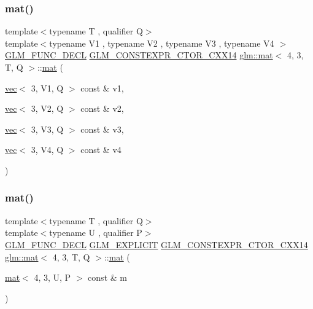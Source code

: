 \subsubsection{\texorpdfstring{mat()}{mat()}\hspace{0.1cm}{\footnotesize\ttfamily [8/21]}}
{\footnotesize\ttfamily template$<$typename T , qualifier Q$>$ \\
template$<$typename V1 , typename V2 , typename V3 , typename V4 $>$ \\
\hyperlink{setup_8hpp_ab2d052de21a70539923e9bcbf6e83a51}{G\+L\+M\+\_\+\+F\+U\+N\+C\+\_\+\+D\+E\+CL} \hyperlink{setup_8hpp_a0900f9145e68bf6061b6f5e7be3fa751}{G\+L\+M\+\_\+\+C\+O\+N\+S\+T\+E\+X\+P\+R\+\_\+\+C\+T\+O\+R\+\_\+\+C\+X\+X14} \hyperlink{structglm_1_1mat}{glm\+::mat}$<$ 4, 3, T, Q $>$\+::\hyperlink{structglm_1_1mat}{mat} (\begin{DoxyParamCaption}\item[{\hyperlink{structglm_1_1vec}{vec}$<$ 3, V1, Q $>$ const \&}]{v1,  }\item[{\hyperlink{structglm_1_1vec}{vec}$<$ 3, V2, Q $>$ const \&}]{v2,  }\item[{\hyperlink{structglm_1_1vec}{vec}$<$ 3, V3, Q $>$ const \&}]{v3,  }\item[{\hyperlink{structglm_1_1vec}{vec}$<$ 3, V4, Q $>$ const \&}]{v4 }\end{DoxyParamCaption})}

\mbox{\label{structglm_1_1mat_3_014_00_013_00_01_t_00_01_q_01_4_a3531198bc8455e7bcac09cbe197c59fd}} 
\subsubsection{\texorpdfstring{mat()}{mat()}\hspace{0.1cm}{\footnotesize\ttfamily [9/21]}}
{\footnotesize\ttfamily template$<$typename T , qualifier Q$>$ \\
template$<$typename U , qualifier P$>$ \\
\hyperlink{setup_8hpp_ab2d052de21a70539923e9bcbf6e83a51}{G\+L\+M\+\_\+\+F\+U\+N\+C\+\_\+\+D\+E\+CL} \hyperlink{setup_8hpp_a6c74f5a5e7b134ab69023ff9a30d4d5d}{G\+L\+M\+\_\+\+E\+X\+P\+L\+I\+C\+IT} \hyperlink{setup_8hpp_a0900f9145e68bf6061b6f5e7be3fa751}{G\+L\+M\+\_\+\+C\+O\+N\+S\+T\+E\+X\+P\+R\+\_\+\+C\+T\+O\+R\+\_\+\+C\+X\+X14} \hyperlink{structglm_1_1mat}{glm\+::mat}$<$ 4, 3, T, Q $>$\+::\hyperlink{structglm_1_1mat}{mat} (\begin{DoxyParamCaption}\item[{\hyperlink{structglm_1_1mat}{mat}$<$ 4, 3, U, P $>$ const \&}]{m }\end{DoxyParamCaption})}


